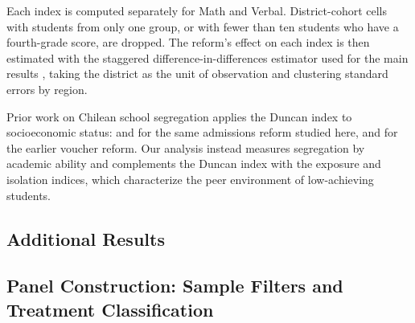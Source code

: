 {Each index is computed separately for Math and Verbal. District-cohort cells with students
from only one group, or with fewer than ten students who have a fourth-grade score, are dropped.
The reform's effect on each index is then estimated with the staggered difference-in-differences
estimator used for the main results \citep{callaway2021}, taking the district as the unit of
observation and clustering standard errors by region.

Prior work on Chilean school segregation applies the Duncan index to socioeconomic status:
\citet{urzua2023} and \citet{botbolgazmuri2026} for the same admissions reform studied here, and
\citet{gazmuri2024} for the earlier voucher reform. Our analysis instead measures segregation by
academic ability and complements the Duncan index with the exposure and isolation indices, which
characterize the peer environment of low-achieving students.}

\subsection{Additional Results}\label{app: additional results}








\subsection{Panel Construction: Sample Filters and Treatment Classification}\label{app: panel construction}


